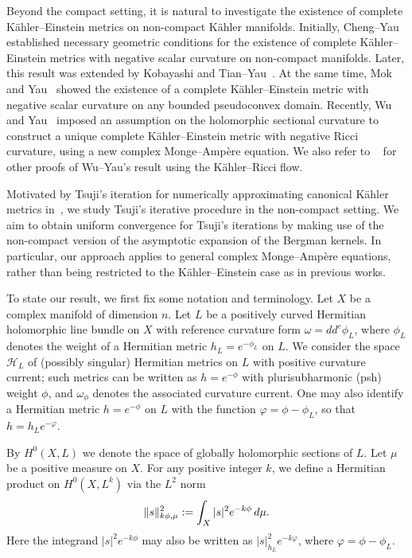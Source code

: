 \documentclass[a4paper, 11pt]{amsart}
\theoremstyle{plain}
\numberwithin{equation}{section} %
\numberwithin{figure}{section} %
\theoremstyle{plain}
\theoremstyle{plain}
\theoremstyle{plain}
\theoremstyle{plain}
\theoremstyle{remark}
\theoremstyle{definition}
\theoremstyle{definition}
\begin{document}
Beyond the compact setting, it is natural to investigate the existence of complete K\"ahler--Einstein metrics on non-compact K\"ahler manifolds. Initially, Cheng--Yau~\cite{ChengYau80-complete} established necessary geometric conditions for the existence of complete K\"ahler--Einstein metrics with negative scalar curvature on non-compact manifolds. Later, this result was extended by Kobayashi \cite{Kobayashi84-KE-open} and Tian--Yau~\cite{TianYau87-KE-complete}. At the same time, Mok and Yau~\cite{Mok-Yau83-completeness} showed the existence of a complete K\"ahler--Einstein metric with negative scalar curvature on any bounded pseudoconvex domain. Recently, Wu and Yau~\cite{Wu-Yau20invariant} imposed an assumption on the holomorphic sectional curvature to construct a unique complete K\"ahler--Einstein metric with negative Ricci curvature, using a new complex Monge--Amp\`ere equation. We also refer to ~\cite{Tong-KRF, Huang_Lee_Tam_Tong_2019} for other proofs of Wu--Yau's result using the K\"ahler--Ricci flow. 

Motivated by Tsuji's iteration for numerically approximating canonical K\"ahler metrics in~\cite{Tsuji10-construction-KE,Tsuji13-construction-KE-pseudoconvex}, we study  Tsuji's iterative procedure in the non-compact setting. We aim  to obtain uniform convergence for Tsuji's iterations by making use of the non-compact version of the asymptotic expansion of the Bergman kernels. {In particular, our approach applies to general complex Monge--Amp\`ere equations, rather than being restricted to the K\"ahler--Einstein case as in previous works.}
\medskip 


To state our result, we first fix some notation and terminology.  
Let $X$ be a complex manifold of dimension $n$. 
Let $L$ be a positively curved Hermitian holomorphic line bundle on $X$ with reference curvature form $\omega = dd^c \phi_L$, where $\phi_L$ denotes the weight of a Hermitian metric $h_L = e^{-\phi_L}$ on $L$. We consider the space $\mathcal{H}_L$ of (possibly singular) Hermitian metrics on $L$ with positive curvature current; such metrics can be written as $h = e^{-\phi}$ with plurisubharmonic (psh) weight $\phi$, and $\omega_\phi$ denotes the associated curvature current. One may also identify a Hermitian metric $h = e^{-\phi}$ on $L$ with the function $\varphi = \phi - \phi_L$, so that $h = h_L e^{-\varphi}$.   

By $H^0(X, L)$ we denote the space of globally holomorphic sections of $L$. 
Let $\mu$ be a positive measure on $X$. 
For any positive integer $k$, we define a Hermitian product on $H^0(X, L^k)$ via the $L^2$ norm
\begin{equation}
    \|s\|^2_{k\phi,\mu} := \int_X |s|^2 e^{-k\phi} \, {\rm d}\mu.
\end{equation}
{Here the integrand $|s|^2 e^{-k\phi}$ may also be written as $|s|^2_{h_L} e^{-k\varphi}$, where $\varphi = \phi - \phi_L$.}
\end{document}
